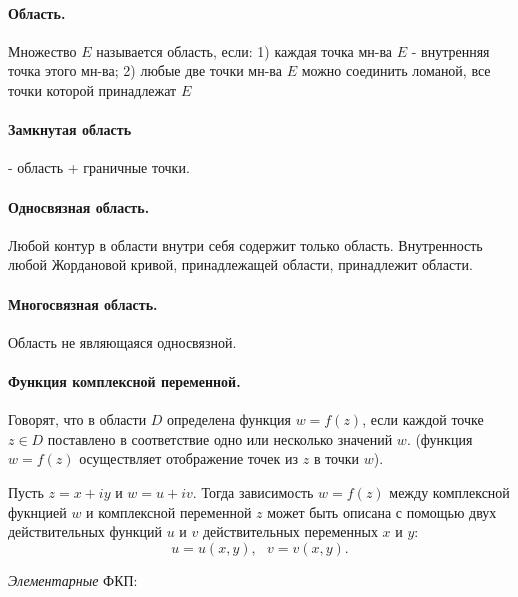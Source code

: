 \documentclass[12pt]{extarticle}
\begin{document}
\paragraph{Область.} Множество $E$ называется область,
если: 1) каждая точка мн-ва $E$ - внутренняя точка этого мн-ва; 2) любые
две точки мн-ва $E$ можно соединить ломаной, все точки которой
принадлежат $E$
\paragraph{Замкнутая область} - область +
граничные точки.
\paragraph{Односвязная область.} Любой контур
в области внутри себя содержит только область.
Внутренность любой Жордановой кривой, принадлежащей области, принадлежит области.
\paragraph{Многосвязная область.} Область не
являющаяся односвязной.


\paragraph{Функция комплексной переменной.} Говорят, что в области $D$ определена функция $w=f(z)$, если каждой
точке $z\in D$ поставлено в соответствие одно или несколько значений
$w$. (функция $w=f(z)$ осуществляет отображение точек из $z$ в точки
$w$).
\par Пусть $z=x+iy$ и $w=u+iv$. Тогда зависимость $w=f(z)$ между
комплексной фукнцией $w$ и комплексной переменной $z$ может быть описана
с помощью двух действительных функций $u$ и $v$ действительных
переменных $x$ и $y$:
\begin{displaymath}
    u=u(x,y),
    \ \ \ v=v(x,y).
\end{displaymath}

\par \textit{Элементарные} ФКП:
\end{document}
